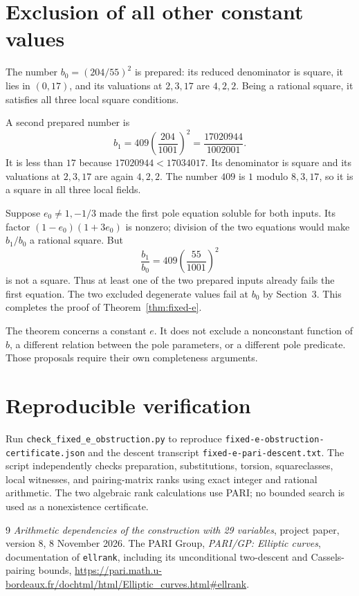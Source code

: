 \documentclass[11pt,a4paper]{article}
\theoremstyle{definition}\newtheorem{definition}[theorem]{Definition}
\begin{document}
\section{Exclusion of all other constant values}

The number $b_0=(204/55)^2$ is prepared: its reduced denominator
is square, it lies in $(0,17)$, and its valuations at $2,3,17$
are $4,2,2$.  Being a rational square, it satisfies all three
local square conditions.

A second prepared number is
\[
 b_1=409\left(\frac{204}{1001}\right)^2
       =\frac{17020944}{1002001}.
\]
It is less than $17$ because $17020944<17034017$.
Its denominator is square and its valuations at $2,3,17$ are
again $4,2,2$.  The number $409$ is $1$ modulo $8,3,17$,
so it is a square in all three local fields.

Suppose $e_0\ne1,-1/3$ made the first pole equation soluble
for both inputs.  Its factor $(1-e_0)(1+3e_0)$ is nonzero;
division of the two equations would make $b_1/b_0$ a rational
square.  But
\[
                     \frac{b_1}{b_0}=409\left(\frac{55}{1001}\right)^2
\]
is not a square.  Thus at least one of the two prepared inputs
already fails the first equation.  The two excluded degenerate
values fail at $b_0$ by Section~3.  This completes the proof of
Theorem~\ref{thm:fixed-e}.

The theorem concerns a constant $e$.  It does not exclude a
nonconstant function of $b$, a different relation between the pole
parameters, or a different pole predicate.  Those proposals require
their own completeness arguments.

\section*{Reproducible verification}

Run \nolinkurl{check_fixed_e_obstruction.py} to reproduce
\nolinkurl{fixed-e-obstruction-certificate.json} and the descent
transcript \nolinkurl{fixed-e-pari-descent.txt}.
The script independently checks preparation, substitutions, torsion,
squareclasses, local witnesses, and pairing-matrix ranks using exact
integer and rational arithmetic. The two algebraic rank calculations
use PARI; no bounded search is used as a nonexistence certificate.

\begin{thebibliography}{9}\small
{}
\emph{Arithmetic dependencies of the construction with 29 variables},
project paper, version 8, 8 November 2026.
The PARI Group, \emph{PARI/GP: Elliptic curves}, documentation of
\texttt{ellrank}, including its unconditional two-descent and
Cassels-pairing bounds,
\url{https://pari.math.u-bordeaux.fr/dochtml/html/Elliptic_curves.html\#ellrank}.
\end{thebibliography}
\end{document}
